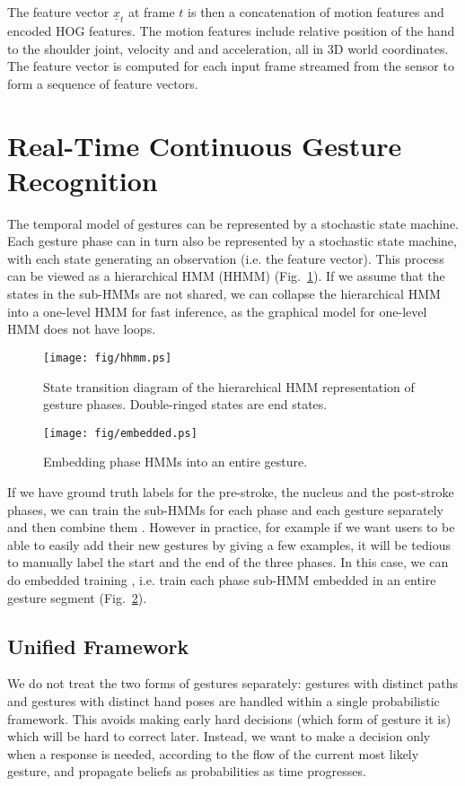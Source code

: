 The feature vector $\underline{x}_t$ at frame $t$ is then a concatenation of motion features and encoded HOG features. The
motion features include relative position of the hand to the shoulder joint,
velocity and and acceleration, all in 3D world coordinates. The feature vector
is computed for each input frame streamed from the sensor to form a sequence of
feature vectors.

\section{Real-Time Continuous Gesture Recognition}
The temporal model of gestures can be represented by a stochastic state machine.
Each gesture phase can in turn also be represented by a stochastic state
machine, with each state generating an observation (i.e. the feature vector).
This process can be viewed as a hierarchical HMM (HHMM) (Fig.~\ref{fig:hhmm}). If we assume
that the states in the sub-HMMs are not shared, we can collapse the hierarchical HMM
into a one-level HMM for fast inference, as the graphical model for one-level
HMM does not have loops.

\begin{figure}[!t]
\centering
\texttt{[image: fig/hhmm.ps]}
\caption{State transition diagram of the hierarchical HMM representation of
gesture phases. Double-ringed states are end states.}
\label{fig:hhmm}
\end{figure}

\begin{figure}[!t]
\centering
\texttt{[image: fig/embedded.ps]}
\caption{Embedding phase HMMs into an entire gesture.}
\label{fig:embed}
\end{figure}

If we have ground truth labels for the pre-stroke, the nucleus and the
post-stroke phases, we can train the sub-HMMs for each phase and each gesture
separately and then combine them \cite{yin13}. However in practice, for example
if we want users to be able to easily add their new gestures by giving a few
examples, it will be tedious to manually label the start and the end of the
three phases. In this case, we can do embedded training \cite{young1994}, i.e.
train each phase sub-HMM embedded in an entire gesture segment
(Fig.~\ref{fig:embed}).

\subsection{Unified Framework}\label{sec:unified}
We do not treat the two forms of gestures separately: gestures with
distinct paths and gestures with distinct hand poses are handled within a
single probabilistic framework. This avoids making early hard decisions (which
form of gesture it is) which will be hard to correct later. Instead, we want to
make a decision only when a response is needed, according to the flow of the
current most likely gesture, and propagate beliefs as probabilities as time progresses.

